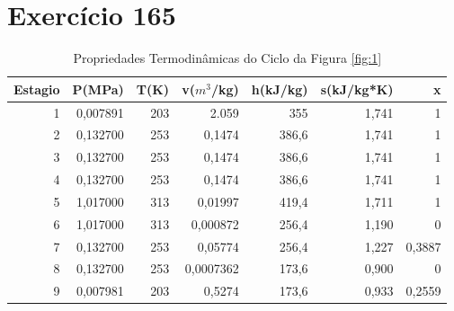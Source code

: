 \section{Exercício 165}


\pagebreak

\begin{table}[htbp]
  \centering
  \caption{ Propriedades Termodinâmicas do Ciclo da Figura \ref{fig:1}}
    \begin{tabular}{rrrrrrr}
    \toprule
    Estagio & P(MPa) & T(K)  & v($m^{3}$/kg) & h(kJ/kg) & s(kJ/kg*K) & x \\
    \midrule
    1     & 0,007891 & 203   & 2.059 & 355   & 1,741 & 1 \\
    2     & 0,132700 & 253   & 0,1474 & 386,6 & 1,741 & 1 \\
    3     & 0,132700 & 253   & 0,1474 & 386,6 & 1,741 & 1 \\
    4     & 0,132700 & 253   & 0,1474 & 386,6 & 1,741 & 1 \\
    5     & 1,017000 & 313   & 0,01997 & 419,4 & 1,711 & 1 \\
    6     & 1,017000 & 313   & 0,000872 & 256,4 & 1,190 & 0 \\
    7     & 0,132700 & 253   & 0,05774 & 256,4 & 1,227 & 0,3887 \\
    8     & 0,132700 & 253   & 0,0007362 & 173,6 & 0,900 & 0 \\
    9     & 0,007981 & 203   & 0,5274 & 173,6 & 0,933 & 0,2559 \\
    \bottomrule
    \end{tabular}%
  \label{tab:1}%
\end{table}%




